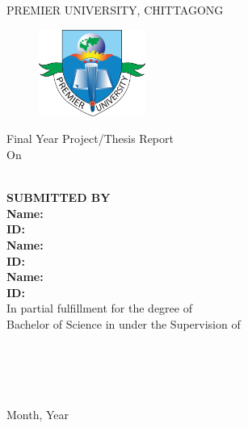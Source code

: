 \begin{titlepage}
    \vspace*{-30mm}
    \begin{center}
    \Large{PREMIER UNIVERSITY, CHITTAGONG}\\
    \large{\department}
    \end{center}
    \vspace*{-5mm}
    \begin{figure}[H]
    \centering
    \includegraphics[width=3.5cm]{figures/puc_logo.png}
    \end{figure} 
    \vspace*{-15mm}
    \begin{center}
        Final Year Project/Thesis Report \\ On \\
        \Large{\textbf{\projectTitle}}\\
        \vspace{15px}
        
        \uppercase{\textbf{SUBMITTED BY}} \\
        \vspace{5px}
        \textbf{Name:} \firstAuthorName\\
        \textbf{ID:} \firstAuthorId \\
        \vspace{5px}
        \textbf{Name:} \secondAuthorName\\
        \textbf{ID:} \secondAuthorId \\
        \vspace{5px}
        \textbf{Name:} \thirdAuthorName\\
        \textbf{ID:} \thirdAuthorId \\
        \vspace{5px}
        In partial fulfillment for the degree of \\
        Bachelor of Science in \dept under the Supervision of
        
        \vspace{10px}
        \supervisorName \\
        \supervisorDesignation \\
        \department \\
        \university \\
        \vspace{5mm}
        Month, Year
        
        \vspace{20px}
               
    \end{center}
    
    
\end{titlepage}
